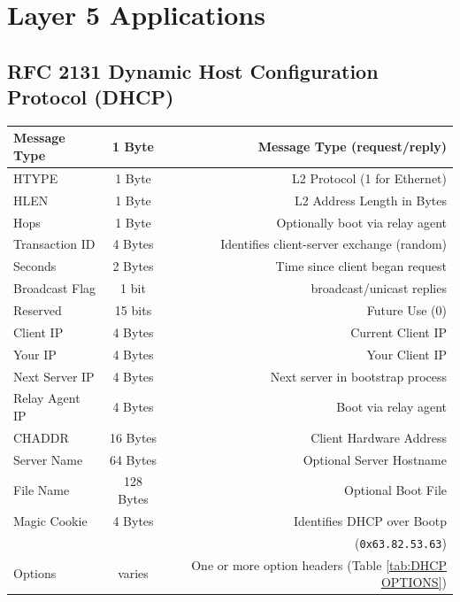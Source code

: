 \documentclass[12pt]{article}
\begin{document}
\section{Layer 5 Applications \label{sec:L5}}

	\subsection{RFC 2131 Dynamic Host Configuration Protocol (DHCP) \label{subsec:DHCP}}
	\begin{table}[H]
	\centering
	\begin{tabular}{| l | c | r |}
	\hline
	Message Type		& 1 Byte	& Message Type (request/reply)\\\hline
	HTYPE			& 1 Byte	& L2 Protocol (1 for Ethernet)\\\hline
	HLEN				& 1 Byte	& L2 Address Length in Bytes\\\hline
	Hops				& 1 Byte	& Optionally boot via relay agent\\\hline
	Transaction ID		& 4 Bytes	& Identifies client-server exchange (random)\\\hline
	Seconds			& 2 Bytes	& Time since client began request\\\hline
	Broadcast Flag		& 1 bit 	& broadcast/unicast replies\\\hline
	Reserved			& 15 bits	& Future Use (0)\\\hline
	Client IP			& 4 Bytes	& Current Client IP\\\hline
	Your IP			& 4 Bytes	& Your Client IP\\\hline
	Next Server IP		& 4 Bytes	& Next server in bootstrap process\\\hline
	Relay Agent IP		& 4 Bytes	& Boot via relay agent\\\hline
	CHADDR			& 16 Bytes	& Client Hardware Address\\\hline
	Server Name		& 64 Bytes	& Optional Server Hostname\\\hline
	File Name			& 128 Bytes	& Optional Boot File\\\hline
	Magic Cookie		& 4 Bytes	& Identifies DHCP over Bootp\\
					&		& (\texttt{0x63.82.53.63})\\\hline
	Options			& varies	& One or more option headers (Table \ref{tab:DHCP OPTIONS})\\\hline
	\end{tabular}\end{table}
\end{document}
